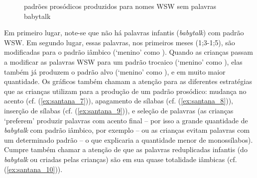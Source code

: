 \documentclass[output=paper]{LSP/langsci}
\begin{document}
\begin{figure}
\caption{padrões prosódicos produzidos para nomes WSW sem palavras babytalk}
\label{fig:santana_7}
\end{figure}

Em primeiro lugar, note-se que não há palavras infantis (\textit{babytalk}) com padrão WSW. Em segundo lugar, essas palavras, nos primeiros meses (1;3-1;5), são modificadas para o padrão iâmbico (`menino' como \ipa{[mi\pstr ni]}). Quando as crianças passam a modificar as palavras WSW para um padrão trocaico (`menino' como ), elas também já produzem o padrão alvo (`menino' como \ipa{[mi\pstr ni.nu]}), e em muito maior quantidade.
 Os gráficos também chamam a atenção para as diferentes estratégias que as crianças utilizam para a produção de um padrão prosódico: mudança no acento (cf. (\ref{ex:santana_7})), apagamento de sílabas (cf. (\ref{ex:santana_8})), inserção de sílabas (cf. (\ref{ex:santana_9})), e seleção de palavras (as crianças `preferem' produzir palavras com acento final – por isso a grande quantidade de \textit{babytalk} com padrão iâmbico, por exemplo – ou as crianças evitam palavras com um determinado padrão – o que explicaria a quantidade menor de monossílabos). Cumpre também chamar a atenção de que as palavras reduplicadas infantis (do \textit{babytalk} ou criadas pelas crianças) são em sua quase totalidade iâmbicas (cf. (\ref{ex:santana_10})).
 
\end{document}
